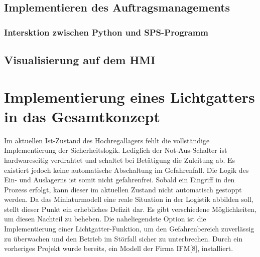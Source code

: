 \subsection{Implementieren des Auftragsmanagements}


\subsubsection{Intersktion zwischen Python und SPS-Programm}


\subsection{Visualisierung auf dem HMI}

\section{Implementierung eines Lichtgatters in das Gesamtkonzept}

Im aktuellen Ist-Zustand des Hochregallagers fehlt die vollständige Implementierung
der Sicherheitslogik.
Lediglich der Not-Aus-Schalter ist hardwareseitig verdrahtet und schaltet bei Betätigung
die Zuleitung ab. Es existiert jedoch keine automatische Abschaltung im Gefahrenfall.
Die Logik des Ein- und Auslagerns ist somit nicht gefahrenfrei. Sobald ein Eingriff in den
Prozess erfolgt, kann dieser im aktuellen Zustand nicht automatisch gestoppt werden.
Da das Miniaturmodell eine reale Situation in der Logistik abbilden soll, stellt dieser
Punkt ein erhebliches Defizit dar.
Es gibt verschiedene Möglichkeiten, um diesen Nachteil zu beheben. Die naheliegendste
Option ist die Implementierung einer Lichtgatter-Funktion, um den Gefahrenbereich
zuverlässig zu überwachen und den Betrieb im Störfall sicher zu unterbrechen. Durch
ein vorheriges Projekt wurde bereits, ein Modell der Firma IFM[8], installiert.

